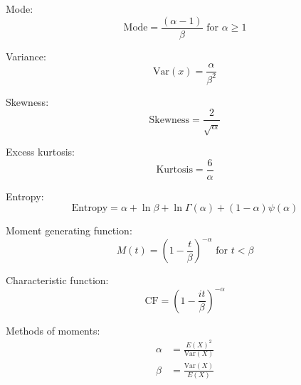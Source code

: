 \documentclass[12pt]{article}
\begin{document}
Mode:
\begin{equation}\label{eq:gamma-mode-2}
	\text{Mode} = \frac{(\alpha-1)}{\beta}\text{ for }\alpha \geq 1
\end{equation}

Variance:
\begin{equation}\label{eq:gamma-variance-2}
	\text{Var}(x) = \frac{\alpha}{\beta^2}
\end{equation}

Skewness:
\begin{equation}\label{eq:gamma-skewness-2}
	\text{Skewness} = \frac{2}{\sqrt{\alpha}}
\end{equation}

Excess kurtosis:
\begin{equation}\label{eq:gamma-kurtosis-2}
	\text{Kurtosis} = \frac{6}{\alpha}
\end{equation}

Entropy:
\begin{equation}\label{eq:gamma-entropy-2}
	\text{Entropy} = \alpha + \ln{\beta} + \ln{\Gamma(\alpha)} + (1-\alpha)\psi(\alpha)
\end{equation}

Moment generating function:
\begin{equation}\label{eq:gamma-mgf-2}
	M(t) = \left(1-\frac{t}{\beta}\right)^{-\alpha}\text{ for }t < \beta
\end{equation}

Characteristic function:
\begin{equation}\label{eq:gamma-cf-2}
	\text{CF} = \left(1-\frac{it}{\beta}\right)^{-\alpha}
\end{equation}

Methods of moments:
\begin{equation}\label{eq:gamma-mom-2}
	\begin{split}
		\alpha	&=	\frac{E(X)^2}{\text{Var}(X)}\\
		\beta	&=	\frac{\text{Var}(X)}{E(X)}
	\end{split}
\end{equation}

\pagebreak

\begin{appendix}
	\listoffigures
	\listoftables
\end{appendix}

\pagebreak{}\printbibliography[heading=bibintoc,title={References}]
\end{document}
